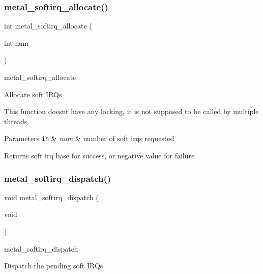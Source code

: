 \subsubsection{\texorpdfstring{metal\+\_\+softirq\+\_\+allocate()}{metal\_softirq\_allocate()}}
{\footnotesize\ttfamily int metal\+\_\+softirq\+\_\+allocate (\begin{DoxyParamCaption}\item[{int}]{num }\end{DoxyParamCaption})}



metal\+\_\+softirq\+\_\+allocate 

Allocate soft I\+R\+Qs

This function doesn\textquotesingle{}t have any locking, it is not supposed to be called by multiple threads.


\begin{DoxyParams}[1]{Parameters}
\mbox{\tt in}  & {\em num} & number of soft irqs requested \\
\hline
\end{DoxyParams}
\begin{DoxyReturn}{Returns}
soft irq base for success, or negative value for failure 
\end{DoxyReturn}
\mbox{\label{group__soft_gabe237beb3e113a94557bdea1603416a6}} 
\subsubsection{\texorpdfstring{metal\+\_\+softirq\+\_\+dispatch()}{metal\_softirq\_dispatch()}}
{\footnotesize\ttfamily void metal\+\_\+softirq\+\_\+dispatch (\begin{DoxyParamCaption}\item[{void}]{ }\end{DoxyParamCaption})}



metal\+\_\+softirq\+\_\+dispatch 

Dispatch the pending soft I\+R\+Qs \mbox{\label{group__soft_gaa63f0ba17ed4114bb70e9f3981e0cb33}} 
